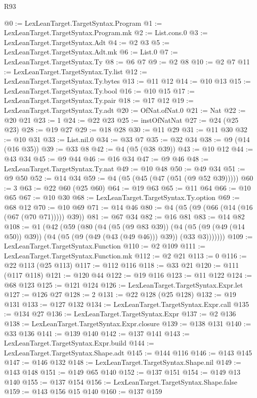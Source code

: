 \begin{lexlean}{R93}
\begin{coremodule}
@0 := LexLeanTarget.TargetSyntax.Program
@1 := LexLeanTarget.TargetSyntax.Program.mk
@2 := List.cons.{0}
@3 := LexLeanTarget.TargetSyntax.Adt
@4 := @2 @3
@5 := LexLeanTarget.TargetSyntax.Adt.mk
@6 := List.{0}
@7 := LexLeanTarget.TargetSyntax.Ty
@8 := @6 @7
@9 := @2 @8
@10 := @2 @7
@11 := LexLeanTarget.TargetSyntax.Ty.list
@12 := LexLeanTarget.TargetSyntax.Ty.bytes
@13 := @11 @12
@14 := @10 @13
@15 := LexLeanTarget.TargetSyntax.Ty.bool
@16 := @10 @15
@17 := LexLeanTarget.TargetSyntax.Ty.pair
@18 := @17 @12
@19 := LexLeanTarget.TargetSyntax.Ty.adt
@20 := OfNat.ofNat.{0}
@21 := Nat
@22 := @20 @21
@23 := 1
@24 := @22 @23
@25 := instOfNatNat
@27 := @24 (@25 @23)
@28 := @19 @27
@29 := @18 @28
@30 := @11 @29
@31 := @11 @30
@32 := @10 @31
@33 := List.nil.{0}
@34 := @33 @7
@35 := @32 @34
@38 := @9 (@14 (@16 @35))
@39 := @33 @8
@42 := @4 (@5 (@38 @39))
@43 := @10 @12
@44 := @43 @34
@45 := @9 @44
@46 := @16 @34
@47 := @9 @46
@48 := LexLeanTarget.TargetSyntax.Ty.nat
@49 := @10 @48
@50 := @49 @34
@51 := @9 @50
@52 := @14 @34
@59 := @4 (@5 (@45 (@47 (@51 (@9 @52 @39)))))
@60 := 3
@63 := @22 @60 (@25 @60)
@64 := @19 @63
@65 := @11 @64
@66 := @10 @65
@67 := @10 @30
@68 := LexLeanTarget.TargetSyntax.Ty.option
@69 := @68 @12
@70 := @10 @69
@71 := @14 @46
@80 := @4 (@5 (@9 (@66 (@14 (@16 (@67 (@70 @71))))) @39))
@81 := @67 @34
@82 := @16 @81
@83 := @14 @82
@108 := @1
    (@42
      (@59
        (@80
          (@4
            (@5 (@9 @83 @39))
            (@4 (@5 (@9 (@49 (@14 @50)) @39)) (@4 (@5 (@9 (@49 (@43 (@49 @46))) @39)) (@33 @3)))))))
@109 := LexLeanTarget.TargetSyntax.Function
@110 := @2 @109
@111 := LexLeanTarget.TargetSyntax.Function.mk
@112 := @2 @21
@113 := 0
@116 := @22 @113 (@25 @113)
@117 := @112 @116
@118 := @33 @21
@120 := @111 (@117 @118)
@121 := @120 @44
@122 := @19 @116
@123 := @11 @122
@124 := @68 @123
@125 := @121 @124
@126 := LexLeanTarget.TargetSyntax.Expr.let
@127 := @126 @27
@128 := 2
@131 := @22 @128 (@25 @128)
@132 := @19 @131
@133 := @127 @132
@134 := LexLeanTarget.TargetSyntax.Expr.call
@135 := @134 @27
@136 := LexLeanTarget.TargetSyntax.Expr
@137 := @2 @136
@138 := LexLeanTarget.TargetSyntax.Expr.closure
@139 := @138 @131
@140 := @33 @136
@141 := @139 @140
@142 := @137 @141
@143 := LexLeanTarget.TargetSyntax.Expr.build
@144 := LexLeanTarget.TargetSyntax.Shape.adt
@145 := @144 @116
@146 := @143 @145
@147 := @146 @132
@148 := LexLeanTarget.TargetSyntax.Shape.nil
@149 := @143 @148
@151 := @149 @65 @140
@152 := @137 @151
@154 := @149 @13 @140
@155 := @137 @154
@156 := LexLeanTarget.TargetSyntax.Shape.false
@159 := @143 @156 @15 @140
@160 := @137 @159

\end{coremodule}
\end{lexlean}
